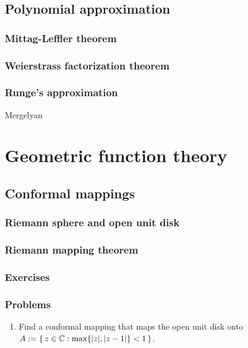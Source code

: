 \documentclass{../note}
\begin{document}
\chapter{Polynomial approximation}
\section{Mittag-Leffler theorem}
\section{Weierstrass factorization theorem}
\section{Runge's approximation}
Mergelyan









\part{Geometric function theory}

\chapter{Conformal mappings}
\section{Riemann sphere and open unit disk}
\section{Riemann mapping theorem}

\section*{Exercises}
\begin{prb}

\end{prb}

\section*{Problems}
\begin{enumerate}
\item Find a conformal mapping that maps the open unit disk onto $A:=\{\,z\in\mathbb{C}:\max\{|z|,|z-1|\}<1\,\}$.
\end{enumerate}
\end{document}
